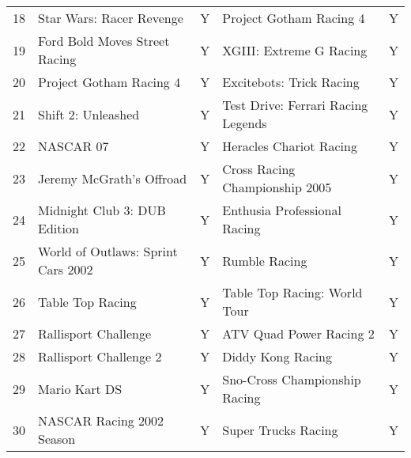 \begin{tabular}{rllll}
   18 &           Star Wars: Racer Revenge &         Y &            Project Gotham Racing 4 &         Y \\
   19 &      Ford Bold Moves Street Racing &         Y &            XGIII: Extreme G Racing &         Y \\
   20 &            Project Gotham Racing 4 &         Y &           Excitebots: Trick Racing &         Y \\
   21 &                 Shift 2: Unleashed &         Y & Test Drive: Ferrari Racing Legends &         Y \\
   22 &                          NASCAR 07 &         Y &            Heracles Chariot Racing &         Y \\
   23 &           Jeremy McGrath's Offroad &         Y &     Cross Racing Championship 2005 &         Y \\
   24 &       Midnight Club 3: DUB Edition &         Y &       Enthusia Professional Racing &         Y \\
   25 & World of Outlaws: Sprint Cars 2002 &         Y &                      Rumble Racing &         Y \\
   26 &                   Table Top Racing &         Y &       Table Top Racing: World Tour &         Y \\
   27 &               Rallisport Challenge &         Y &            ATV Quad Power Racing 2 &         Y \\
   28 &             Rallisport Challenge 2 &         Y &                  Diddy Kong Racing &         Y \\
   29 &                      Mario Kart DS &         Y &      Sno-Cross Championship Racing &         Y \\
   30 &          NASCAR Racing 2002 Season &         Y &                Super Trucks Racing &         Y \\
\bottomrule
\end{tabular}
